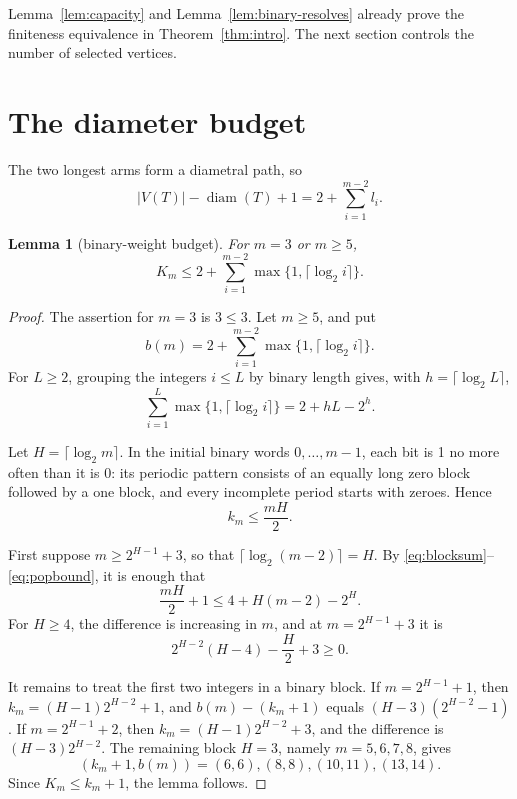 \documentclass[11pt]{amsart}
\newtheorem{lemma}[theorem]{Lemma}
\theoremstyle{definition}
\newcommand{\diam}{\operatorname{diam}}
\begin{document}
Lemma~\ref{lem:capacity} and Lemma~\ref{lem:binary-resolves} already prove the
finiteness equivalence in Theorem~\ref{thm:intro}.  The next section controls
the number of selected vertices.

\section{The diameter budget}

The two longest arms form a diametral path, so
\begin{equation}
 |V(T)|-\diam(T)+1=2+\sum_{i=1}^{m-2}l_i.                  \label{eq:budget}
\end{equation}

\begin{lemma}[binary-weight budget]\label{lem:weight}
For \(m=3\) or \(m\ge5\),
\[
 K_m\le 2+\sum_{i=1}^{m-2}\max\{1,\lceil\log_2i\rceil\}.
\]
\end{lemma}

\begin{proof}
The assertion for \(m=3\) is \(3\le3\).  Let \(m\ge5\), and put
\[
 b(m)=2+\sum_{i=1}^{m-2}\max\{1,\lceil\log_2i\rceil\}.
\]
For \(L\ge2\), grouping the integers \(i\le L\) by binary length gives, with
\(h=\lceil\log_2L\rceil\),
\begin{equation}
 \sum_{i=1}^{L}\max\{1,\lceil\log_2i\rceil\}
 =2+hL-2^h.                                                \label{eq:blocksum}
\end{equation}

Let \(H=\lceil\log_2m\rceil\).  In the initial binary words
\(0,\ldots,m-1\), each bit is 1 no more often than it is 0: its periodic
pattern consists of an equally long zero block followed by a one block, and
every incomplete period starts with zeroes.  Hence
\begin{equation}
 k_m\le \frac{mH}{2}.                                      \label{eq:popbound}
\end{equation}

First suppose \(m\ge2^{H-1}+3\), so that
\(\lceil\log_2(m-2)\rceil=H\).  By
\eqref{eq:blocksum}--\eqref{eq:popbound}, it is enough that
\[
 \frac{mH}{2}+1\le4+H(m-2)-2^H.
\]
For \(H\ge4\), the difference is increasing in \(m\), and at
\(m=2^{H-1}+3\) it is
\[
 2^{H-2}(H-4)-\frac H2+3\ge0.
\]

It remains to treat the first two integers in a binary block.  If
\(m=2^{H-1}+1\), then
\(k_m=(H-1)2^{H-2}+1\), and \(b(m)-(k_m+1)\) equals
\((H-3)(2^{H-2}-1)\).  If \(m=2^{H-1}+2\), then
\(k_m=(H-1)2^{H-2}+3\), and the difference is
\((H-3)2^{H-2}\).  The remaining block \(H=3\), namely
\(m=5,6,7,8\), gives
\[
 (k_m+1,b(m))=(6,6),(8,8),(10,11),(13,14).
\]
Since \(K_m\le k_m+1\), the lemma follows.
\end{proof}
\end{document}
